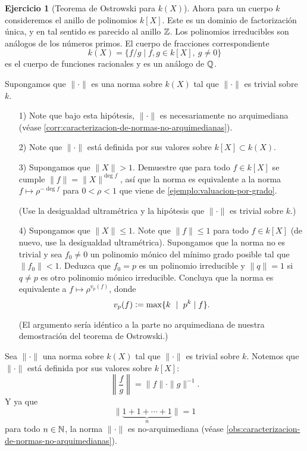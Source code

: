 \documentclass{article}
\numberwithin{equation}{section}
\theoremstyle{definition}
\newtheorem{ejerc}{Ejercicio}
\begin{document}
\begin{ejerc}[Teorema de Ostrowski para $k (X)$]
  Ahora para un cuerpo $k$ consideremos el anillo de polinomios $k [X]$.
  Este es un dominio de factorización única, y en tal sentido es parecido
  al anillo $\mathbb{Z}$. Los polinomios irreducibles son análogos de los números
  primos. El cuerpo de fracciones correspondiente
  $$k (X) = \{ f/g \mid f,g\in k [X], ~ g\ne 0 \}$$
  es el cuerpo de funciones racionales y es un análogo de $\mathbb{Q}$.

  \vspace{1em}

  Supongamos que $\|\cdot\|$ es una norma sobre $k (X)$ tal que $\|\cdot\|$ es
  trivial sobre $k$.

  \begin{enumerate}
  \item[1)] Note que bajo esta hipótesis, $\|\cdot\|$ es necesariamente
    no arquimediana (véase
    \ref{corr:caracterizacion-de-normas-no-arquimedianas}).

  \item[2)] Note que $\|\cdot\|$ está definida por sus valores sobre
    $k [X] \subset k (X)$.

  \item[3)] Supongamos que $\|X\| > 1$. Demuestre que para todo $f \in k [X]$
    se cumple $\|f\| = \|X\|^{\deg f}$, así que la norma es equivalente
    a la norma $f \mapsto \rho^{-\deg f}$ para $0 < \rho < 1$ que viene de
    \ref{ejemplo:valuacion-por-grado}.

    (Use la desigualdad ultramétrica y la hipótesis que $\|\cdot\|$ es trivial
    sobre $k$.)

  \item[4)] Supongamos que $\|X\| \le 1$. Note que $\|f\| \le 1$ para todo
    $f\in k [X]$ (de nuevo, use la desigualdad ultramétrica). Supongamos que
    la norma no es trivial y sea $f_0\ne 0$ un polinomio mónico del mínimo grado
    posible tal que $\|f_0\| < 1$. Deduzca que $f_0 = p$ es un polinomio
    irreducible y $\|q\| = 1$ si $q\ne p$ es otro polinomio mónico
    irreducible. Concluya que la norma es equivalente a
    $f \mapsto \rho^{v_p (f)}$, donde
    $$v_p (f) \mathrel{\mathop:}= \max \{ k ~\mid~ p^k \mid f \}.$$

    (El argumento sería idéntico a la parte no arquimediana de nuestra
    demostración del teorema de Ostrowski.)
  \end{enumerate}

  \ifdefined\solutions\begin{solucion}
    Sea $\|\cdot\|$ una norma sobre $k (X)$ tal que $\|\cdot\|$ es trivial sobre
    $k$. Notemos que $\|\cdot\|$ está definida por sus valores sobre $k [X]$:
    $$\left\|\frac{f}{g}\right\| = \|f\|\cdot \|g\|^{-1}.$$
    Y ya que
    $$\|\underbrace{1+1+\cdots+1}_n\| = 1$$
    para todo $n \in \mathbb{N}$, la norma $\|\cdot\|$ es no-arquimediana
    (véase \ref{obs:caracterizacion-de-normas-no-arquimedianas}).


\end{solucion}
\end{ejerc}
\end{document}
